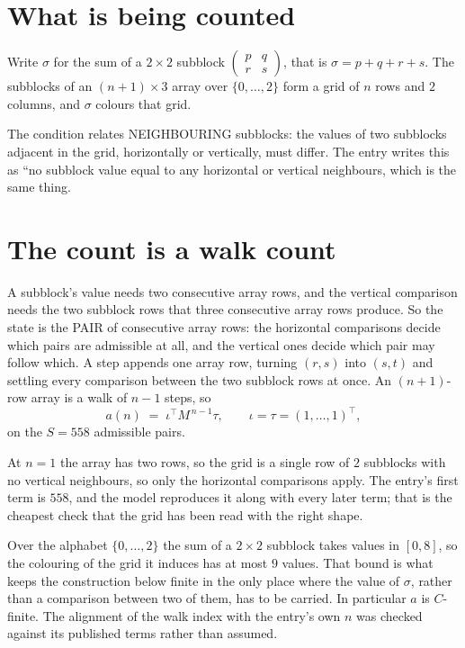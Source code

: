 \documentclass[11pt,a4paper]{article}
\theoremstyle{plain}
\theoremstyle{definition}
\begin{document}
\section{What is being counted}

Write $\sigma$ for the sum of a $2\times2$ subblock
$\begin{pmatrix}p&q\\r&s\end{pmatrix}$, that is $\sigma=p+q+r+s$. The subblocks of an
$(n+1)\times3$ array over $\{0,\dots,2\}$ form a grid of $n$ rows and $2$
columns, and $\sigma$ colours that grid.

The condition relates NEIGHBOURING subblocks: the values of two subblocks adjacent in the grid,
horizontally or vertically, must differ. The entry writes this as ``no subblock value equal to any horizontal or vertical neighbours, which is the same thing.

\section{The count is a walk count}

A subblock's value needs two consecutive array rows, and the vertical
comparison needs the two subblock rows that three consecutive array rows produce. So the state
is the PAIR of consecutive array rows: the horizontal comparisons decide which pairs are
admissible at all, and the vertical ones decide which pair may follow which. A step appends one
array row, turning $(r,s)$ into $(s,t)$ and settling every comparison between the two subblock
rows at once. An $(n+1)$-row array is a walk of $n-1$ steps, so
\[
a(n)\;=\;\iota^{\!\top}M^{\,n-1}\tau,\qquad\iota=\tau=(1,\dots,1)^{\!\top},
\]
on the $S=558$ admissible pairs.

At $n=1$ the array has two rows, so the grid is a single row of $2$
subblocks with no vertical neighbours, so only the horizontal comparisons apply. The
entry's first term is $558$, and the model reproduces it along with every later term; that
is the cheapest check that the grid has been read with the right shape.

Over the alphabet $\{0,\dots,2\}$ the sum of a $2\times2$ subblock takes values in
$[0,8]$, so the colouring of the grid it induces has at most $9$ values.
That bound is what keeps the construction below finite in the only place where the value of
$\sigma$, rather than a comparison between two of them, has to be carried.
In particular $a$ is $C$-finite. The alignment of the walk index with the entry's own $n$ was
checked against its published terms rather than assumed.
\end{document}
